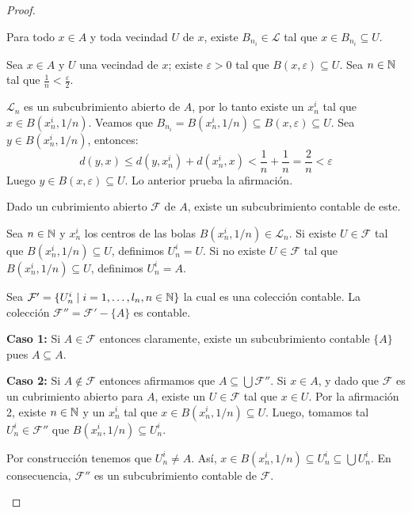 \begin{proof}
    \begin{afirmacion}
        Para todo $x \in A$ y toda vecindad $U$ de $x$, existe $B_{n_i} \in \mathcal{L}$ tal que $x \in B_{n_i} \subseteq U$.
    \end{afirmacion}
    
    \begin{prueba}
    Sea $x \in A$ y $U$ una vecindad de $x$; existe $\varepsilon > 0$ tal que $B(x, \varepsilon) \subseteq U$. Sea $n \in \mathbb{N}$ tal que $\frac{1}{n} < \frac{\varepsilon}{2}$.
    
    $\mathcal{L}_n$ es un subcubrimiento abierto de $A$, por lo tanto existe un $x_n^i$ tal que $x \in B(x_n^i, 1/n)$. Veamos que $B_{n_i} = B(x_n^i, 1/n) \subseteq B(x, \varepsilon) \subseteq U$. Sea $y \in B(x_n^i, 1/n)$, entonces:
    \[d(y, x) \le d(y, x_n^i) + d(x_n^i, x) < \frac{1}{n} + \frac{1}{n} = \frac{2}{n} < \varepsilon\]
    Luego $y \in B(x, \varepsilon) \subseteq U$. Lo anterior prueba la afirmación.
    \end{prueba}

    \begin{afirmacion}
        Dado un cubrimiento abierto $\mathcal{F}$ de $A$, existe un subcubrimiento contable de este.
    \end{afirmacion}
    
    \begin{prueba}
    Sea $n \in \mathbb{N}$ y $x_n^i$ los centros de las bolas $B(x_n^i, 1/n) \in \mathcal{L}_n$. 
    Si existe $U \in \mathcal{F}$ tal que $B(x_n^i, 1/n) \subseteq U$, definimos $U_n^i = U$. Si no existe $U \in \mathcal{F}$ tal que $B(x_n^i, 1/n) \subseteq U$, definimos $U_n^i = A$.
    
    Sea $\mathcal{F}' = \{ U_n^i \mid i=1,\dots,l_n, n \in \mathbb{N} \}$ la cual es una colección contable. La colección $\mathcal{F}'' = \mathcal{F}' - \{A\}$ es contable.
    
    \textbf{Caso 1:} Si $A \in \mathcal{F}$ entonces claramente, existe un subcubrimiento contable $\{A\}$ pues $A \subseteq A$.
    
    \textbf{Caso 2:} Si $A \notin \mathcal{F}$ entonces afirmamos que $A \subseteq \bigcup \mathcal{F}''$. Si $x \in A$, y dado que $\mathcal{F}$ es un cubrimiento abierto para $A$, existe un $U \in \mathcal{F}$ tal que $x \in U$. Por la afirmación 2, existe $n \in \mathbb{N}$ y un $x_n^i$ tal que $x \in B(x_n^i, 1/n) \subseteq U$. Luego, tomamos tal $U_n^i \in \mathcal{F}''$ que $B(x_n^i, 1/n) \subseteq U_n^i$. 
    
    Por construcción tenemos que $U_n^i \ne A$. Así, $x \in B(x_n^i, 1/n) \subseteq U_n^i \subseteq \bigcup U_n^i$. En consecuencia, $\mathcal{F}''$ es un subcubrimiento contable de $\mathcal{F}$.
    \end{prueba}


\end{proof}
